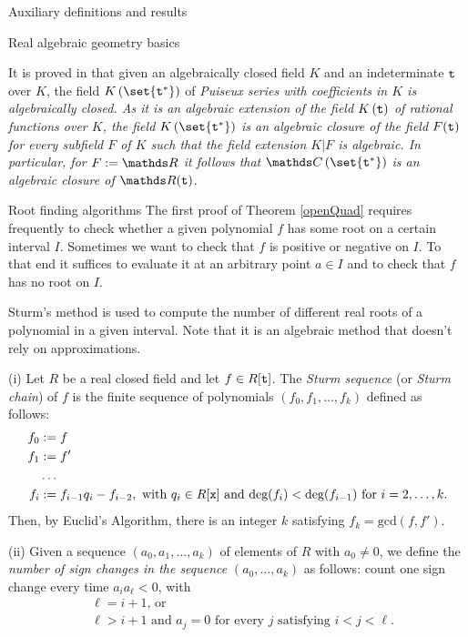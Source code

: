 \documentclass[11pt, a4paper, english, twoside, notitlepage, openright]{report}
\begin{document}
\begin{chapter}{Auxiliary definitions and results}
\begin{section}{Real algebraic geometry basics}
\begin{definition} \label{puiseux} It is proved in \cite[pp. 98-102]{w} that given an algebraically closed field $K$ and an indeterminate ${\tt t}$ over $K$, the field $K\left(\set{{\tt t}^*}\right)$ of \em Puiseux series \em with coefficients in $K$ is algebraically closed. As it is an algebraic extension of the field $K\left({\tt t}\right)$ of rational functions over $K$, the field $K\left(\set{{\tt t}^*}\right)$ is an algebraic closure of the field $F({\tt t})$ for every subfield $F$ of $K$ such that the field extension $K|F$ is algebraic. In particular, for $F:=\R$ it follows that $\C\left(\set{{\tt t}^*}\right)$ is an algebraic closure of $\R({\tt t})$.
\end{definition}
\end{section}

\begin{section}{Root finding algorithms}
The first proof of Theorem \ref{openQuad} requires frequently to check whether a given polynomial $f$ has some root on a certain interval $I$. Sometimes we want to check that $f$ is positive or negative on $I$. To that end it suffices to evaluate it at an arbitrary point $a\in I$ and to check that $f$ has no root on $I$.

Sturm's method is used to compute the number of different real roots of a polynomial in a given interval. Note that it is an algebraic method that doesn't rely on approximations.

\begin{definitions}\label{sturmSeq} (i) Let $R$ be a real closed field and let $f\in R[{\tt t}]$. The \emph{Sturm sequence} (or \emph{Sturm chain}) of $f$ is the finite sequence of polynomials $(f_0,f_1,\dots,f_k)$ defined as follows: 
\begin{equation*}
\begin{aligned}
f_0&:=f\\
f_1&:=f'\\
&\dots\\
f_i&:=f_{i-1}q_i-f_{i-2}, \text{ with }q_{i}\in R[{\tt x}] \text{ and } \text{deg}(f_{i})<\text{deg}(f_{i-1}) \text{ for } i=2,\dots,k.\\
\end{aligned}
\end{equation*}
Then, by Euclid's Algorithm, there is an integer $k$ satisfying $f_k=\text{gcd}(f,f')$.
	
(ii) Given a sequence $(a_0, a_1, \dots, a_k)$ of elements of $R$ with $a_0 \ne 0$, we define the \emph{number of sign changes in the sequence} $(a_0, \dots, a_k)$ as follows: count one sign change every time $a_ia_{\ell} < 0$, with 
\begin{equation*}
\begin{aligned}
&\ell=i+1 \text{, or }\\
&\ell>i+1 \text{ and }a_j=0 \text{ for every } j \text{ satisfying  } i<j<\ell.\\ 
\end{aligned}
\end{equation*}


\end{definitions}
\end{section}
\end{chapter}
\end{document}

